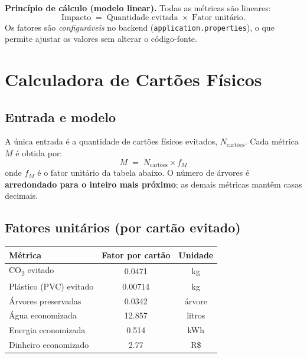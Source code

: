 \documentclass[11pt,a4paper]{article}
\begin{document}
\begin{notebox}
\textbf{Princípio de cálculo (modelo linear).} Todas as métricas são lineares:
\[
\text{Impacto} \;=\; \text{Quantidade evitada} \;\times\; \text{Fator unitário}.
\]
Os fatores são \emph{configuráveis} no backend
(\texttt{application.properties}), o que permite ajustar os valores sem alterar
o código-fonte.
\end{notebox}

\section{Calculadora de Cartões Físicos}

\subsection{Entrada e modelo}

A única entrada é a quantidade de cartões físicos evitados, $N_{\text{cartões}}$.
Cada métrica $M$ é obtida por:
\[
M \;=\; N_{\text{cartões}} \times f_M
\]
onde $f_M$ é o fator unitário da tabela abaixo. O número de árvores é
\textbf{arredondado para o inteiro mais próximo}; as demais métricas mantêm casas decimais.

\subsection{Fatores unitários (por cartão evitado)}

\begin{center}
\begin{tabularx}{\linewidth}{Y c c}
\toprule
{}
\textbf{Métrica} & \textbf{Fator por cartão} & \textbf{Unidade} \\
\midrule
CO\textsubscript{2} evitado          & \num{0.0471}  & kg \\
Plástico (PVC) evitado               & \num{0.00714} & kg \\
Árvores preservadas                  & \num{0.0342}  & árvore \\
Água economizada                     & \num{12.857}  & litros \\
Energia economizada                  & \num{0.514}   & kWh \\
Dinheiro economizado                 & \num{2.77}    & R\$ \\
\bottomrule
\end{tabularx}
\end{center}
\end{document}
